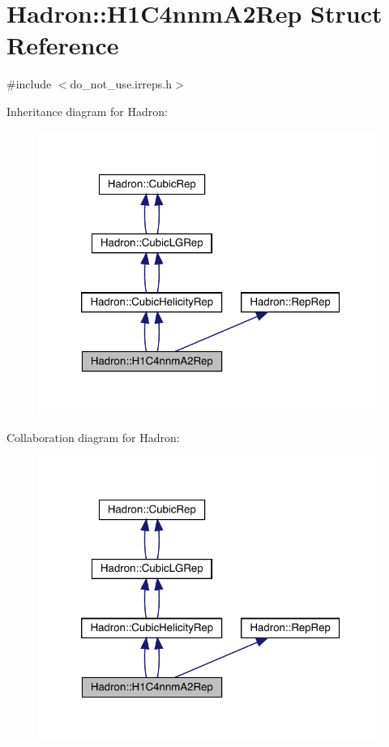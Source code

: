 \hypertarget{structHadron_1_1H1C4nnmA2Rep}{}\section{Hadron\+:\+:H1\+C4nnm\+A2\+Rep Struct Reference}
\label{structHadron_1_1H1C4nnmA2Rep}


{\ttfamily \#include $<$do\+\_\+not\+\_\+use.\+irreps.\+h$>$}



Inheritance diagram for Hadron\+:\nopagebreak
\begin{figure}[H]
\begin{center}
\leavevmode
\includegraphics[width=320pt]{dd/da7/structHadron_1_1H1C4nnmA2Rep__inherit__graph}
\end{center}
\end{figure}


Collaboration diagram for Hadron\+:\nopagebreak
\begin{figure}[H]
\begin{center}
\leavevmode
\includegraphics[width=320pt]{d4/d2d/structHadron_1_1H1C4nnmA2Rep__coll__graph}
\end{center}
\end{figure}
